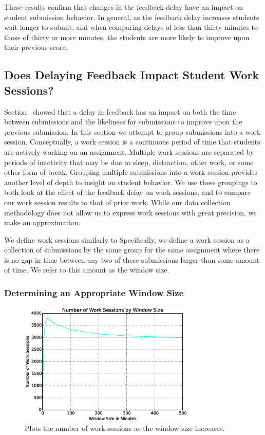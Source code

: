 These results confirm that changes in the feedback delay have an impact on
student submission behavior. In general, as the feedback delay increases
students wait longer to submit, and when comparing delays of less than thirty
minutes to those of thirty or more minutes, the students are more likely to
improve upon their previous score.

\subsection{Does Delaying Feedback Impact Student Work Sessions?} 
Section~ showed that a delay in feedback has an impact
on both the time between submissions and the likeliness for submissions to
improve upon the previous submission. In this section we attempt to group
submissions into a work session. Conceptually, a work session is a continuous
period of time that students are actively working on an assignment. Multiple
work sessions are separated by periods of inactivity that may be due to sleep,
distraction, other work, or some other form of break. Grouping multiple
submissions into a work session provides another level of depth to insight on
student behavior. We use these groupings to both look at the effect of the
feedback delay on work sessions, and to compare our work session results to
that of prior work. While our data collection methodology does not allow us to
express work sessions with great precision, we make an approximation.

We define work sessions similarly to \spacco[.]{} Specifically, we define a
work session as a collection of submissions by the same group for the same
assignment where there is no gap in time between any two of these submissions
larger than some amount of time. We refer to this amount as the window size.

\subsubsection{Determining an Appropriate Window Size}

\begin{figure}[!t]
\centering
\includegraphics[width=3.3in]{graphs/Number_of_Work_Sessions_by_Window_Size.eps}
\caption{Plots the number of work sessions as the window size increases.}
\end{figure}

